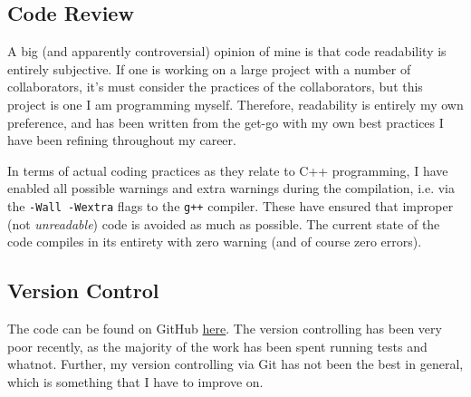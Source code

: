 \subsection{Code Review}

A big (and apparently controversial) opinion of mine is that code readability is entirely subjective. If one is working on a large project with a number of collaborators, it's must consider the practices of the collaborators, but this project is one I am programming myself. Therefore, readability is entirely my own preference, and has been written from the get-go with my own best practices I have been refining throughout my career.

In terms of actual coding practices as they relate to C++ programming, I have enabled all possible warnings and extra warnings during the compilation, i.e. via the \texttt{-Wall -Wextra} flags to the \texttt{g++} compiler. These have ensured that improper (not \textit{unreadable}) code is avoided as much as possible. The current state of the code compiles in its entirety with zero warning (and of course zero errors).


\subsection{Version Control}

The code can be found on GitHub \href{https://github.com/champso1/ColSim}{here}. The version controlling has been very poor recently, as the majority of the work has been spent running tests and whatnot. Further, my version controlling via Git has not been the best in general, which is something that I have to improve on. 




